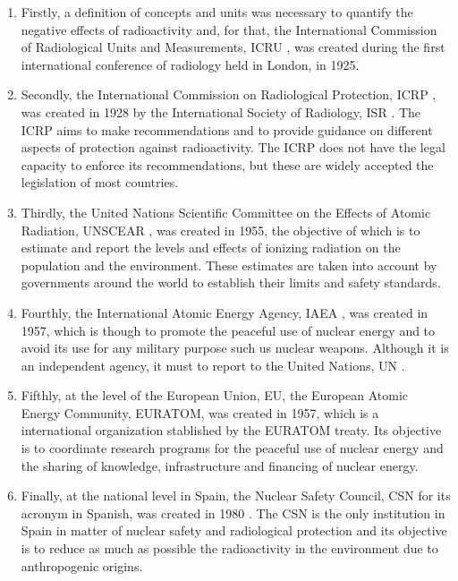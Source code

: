 \begin{enumerate}
\item{} Firstly, a definition of concepts and units was necessary to quantify the negative effects of radioactivity and, for that, the International Commission of Radiological Units and Measurements, ICRU \cite{ICRU}, was created during the first international conference of radiology held in London, in 1925.

\item{} Secondly, the International Commission on Radiological Protection, ICRP \cite{ICRP}, was created in 1928 by the International Society of Radiology, ISR \cite{ISR}. The ICRP aims to make recommendations and to provide guidance on different aspects of protection against radioactivity. The ICRP does not have the legal capacity to enforce its recommendations, but these are widely accepted the legislation of most countries. %

\item{} Thirdly, the United Nations Scientific Committee on the Effects of Atomic Radiation, UNSCEAR \cite{UNSCEAR}, was created in 1955, the objective of which is to estimate and report the levels and effects of ionizing radiation on the population and the environment. These estimates are taken into account by governments around the world to establish their limits and safety standards.

\item{} Fourthly, the International Atomic Energy Agency, IAEA \cite{IAEA}, was created in 1957, which is though to promote the peaceful use of nuclear energy and to avoid its use for any military purpose such us nuclear weapons. Although it is an independent agency, it must to report to the United Nations, UN \cite{UN}.

\item{} Fifthly, at the level of the European Union, EU, the European Atomic Energy Community, EURATOM, was created in 1957, which is a international organization stablished by the EURATOM treaty. Its objective is to coordinate research programs for the peaceful use of nuclear energy and the sharing of knowledge, infrastructure and financing of nuclear energy.

\item{} Finally, at the national level in Spain, the Nuclear Safety Council, CSN for its acronym in Spanish, was created in 1980 \cite{CSN}. The CSN is the only institution in Spain in matter of nuclear safety and radiological protection and its objective is to reduce as much as possible the radioactivity in the environment due to anthropogenic origins.


\end{enumerate}
